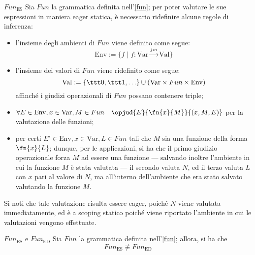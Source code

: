 \documentclass[a4paper, 12pt]{report}
\begin{document}
    \begin{framedprop}{$Fun_\mathrm{ES}$}
        Sia $Fun$ la grammatica definita nell'\cref{fun}; per poter valutare le sue espressioni in maniera eager statica, è necessario ridefinire alcune regole di inferenza:

        \begin{itemize}
            \item l'insieme degli ambienti di $Fun$ viene definito come segue: $$\mathrm{Env} := \{f \mid f : \mathrm{Var} \xrightarrow{fin} \mathrm{Val}\}$$
            \item l'insieme dei valori di $Fun$ viene ridefinito come segue: $$\mathrm{Val} := \{ \ttt 0, \ttt 1, \ldots \} \cup (\mathrm{Var} \times Fun \times \mathrm{Env})$$ affinché i giudizi operazionali di $Fun$ possano contenere triple;
            \item $\forall E \in \mathrm{Env}, x \in \mathrm{Var}, M \in Fun \quad \opjud{E}{\fn{x}{M}}{(x,M,E)}$ per la valutazione delle funzioni;
            \item {} per certi $E' \in \mathrm{Env}, x \in \mathrm{Var}, L \in Fun$ tali che $M$ sia una funzione della forma $\fn{x}{L}$; dunque, per le applicazioni, si ha che il primo giudizio operazionale forza $M$ ad essere una funzione --- salvando inoltre l'ambiente in cui la funzione $M$ è stata valutata --- il secondo valuta $N$, ed il terzo valuta $L$ con $x$ pari al valore di $N$, ma all'interno dell'ambiente che era stato salvato valutando la funzione $M$.
        \end{itemize}

        Si noti che tale valutazione risulta essere eager, poiché $N$ viene valutata immediatamente, ed è a scoping statico poiché viene riportato l'ambiente in cui le valutazioni vengono effettuate.
    \end{framedprop}

    \begin{framedlem}[label={fun lemma pt1}]{$Fun_\mathrm{ES}$ e $Fun_\mathrm{ED}$}
        Sia $Fun$ la grammatica definita nell'\cref{fun}; allora, si ha che $$Fun_\mathrm{ES} \not\equiv Fun_\mathrm{ED}$$
    \end{framedlem}
\end{document}
